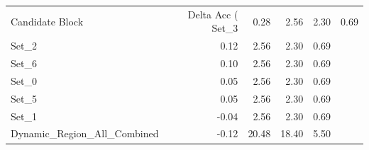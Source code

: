 \begin{tabular}{lrrrr}
\toprule
Candidate Block & Delta Acc (%
\midrule
Set_3 & 0.28 & 2.56 & 2.30 & 0.69 \\
Set_2 & 0.12 & 2.56 & 2.30 & 0.69 \\
Set_6 & 0.10 & 2.56 & 2.30 & 0.69 \\
Set_0 & 0.05 & 2.56 & 2.30 & 0.69 \\
Set_5 & 0.05 & 2.56 & 2.30 & 0.69 \\
Set_1 & -0.04 & 2.56 & 2.30 & 0.69 \\
Dynamic_Region_All_Combined & -0.12 & 20.48 & 18.40 & 5.50 \\
\bottomrule
\end{tabular}
